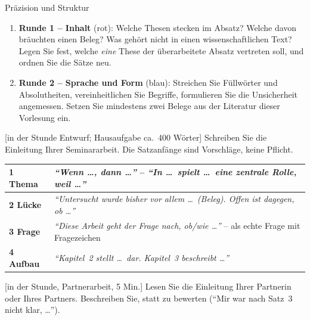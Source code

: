 \begin{uebungsblatt}{Präzision und Struktur}
\begin{enumerate}
  \item \textbf{Runde 1 -- Inhalt} (rot): Welche Thesen stecken im
    Absatz? Welche davon bräuchten einen Beleg? Was gehört nicht in einen
    wissenschaftlichen Text? Legen Sie fest, welche \emph{eine} These der
    überarbeitete Absatz vertreten soll, und ordnen Sie die Sätze neu.
  \item \textbf{Runde 2 -- Sprache und Form} (blau): Streichen Sie
    Füllwörter und Absolutheiten, vereinheitlichen Sie Begriffe,
    formulieren Sie die Unsicherheit angemessen. Setzen Sie mindestens zwei
    Belege aus der Literatur dieser Vorlesung ein.
\end{enumerate}

[in der Stunde Entwurf; Hausaufgabe ca.\ 400 Wörter]
Schreiben Sie die Einleitung Ihrer Seminararbeit. Die Satzanfänge sind
Vorschläge, keine Pflicht.

\begin{center}\small
\renewcommand{\arraystretch}{1.4}
\begin{tabular}{|p{}|p{}|}
\hline
\textbf{1 Thema} & \emph{\enquote{Wenn \ldots, dann \ldots}} -- \emph{\enquote{In \ldots\ spielt \ldots\ eine zentrale Rolle, weil \ldots}} \\[8mm]
\hline
\textbf{2 Lücke} & \emph{\enquote{Untersucht wurde bisher vor allem \ldots\ (Beleg). Offen ist dagegen, ob \ldots}} \\[8mm]
\hline
\textbf{3 Frage} & \emph{\enquote{Diese Arbeit geht der Frage nach, ob/wie \ldots}} -- als echte Frage mit Fragezeichen \\[8mm]
\hline
\textbf{4 Aufbau} & \emph{\enquote{Kapitel~2 stellt \ldots\ dar. Kapitel~3 beschreibt \ldots}} \\[8mm]
\hline
\end{tabular}
\end{center}

[in der Stunde, Partnerarbeit, 5 Min.]
Lesen Sie die Einleitung Ihrer Partnerin oder Ihres Partners. Beschreiben
Sie, statt zu bewerten (\enquote{Mir war nach Satz~3 nicht klar, \ldots}).


\end{uebungsblatt}
